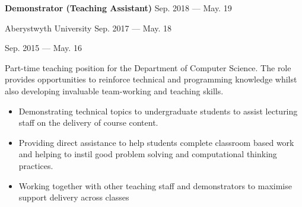 \parbox[t][][t]{\linewidth}{
    \parbox{\linewidth}{{\textbf{Demonstrator (Teaching Assistant)}
        \hfill {{Sep. 2018 --- May. 19}}}}
    \parbox{\linewidth}{{Aberystwyth University
        \hfill {{Sep. 2017 --- May. 18}}}}
        \parbox{\linewidth}{{
            \hfill {{Sep. 2015 --- May. 16}}}}
    \smallbreak
    
    \bigskip
    Part-time teaching position for the Department of Computer Science. The role provides opportunities to reinforce technical and programming knowledge
    whilst also developing invaluable team-working and teaching skills.
            
    \bigskip
    \begin{itemize}
        \item{Demonstrating technical topics to undergraduate students to assist lecturing staff on the delivery of course content.}\\[-.6em]
        \item{Providing direct assistance to help students complete classroom based work and helping to instil good problem solving and computational thinking practices.}\\[-.6em]
        \item{Working together with other teaching staff and demonstrators to maximise support delivery across classes}\\[-.6em]
    \end{itemize}
    \bigskip
}

    
    
    

